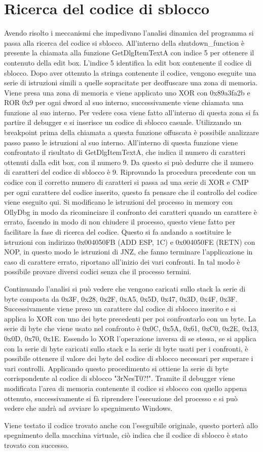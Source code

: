 \documentclass[a4paper,12pt]{article}
\begin{document}
\section{Ricerca del codice di sblocco}
Avendo risolto i meccanismi che impedivano l'analisi dinamica del programma si passa alla ricerca del codice si sblocco. All'interno della shutdown\_function è presente la chiamata alla funzione GetDlgItemTextA con indice 5 per ottenere il contenuto della edit box.  L'indice 5 identifica la edit box contenente il codice di sblocco. 
Dopo aver ottenuto la stringa contenente il codice, vengono eseguite una serie di istruzioni simili a quelle sopracitate per deoffuscare una zona di memoria. Viene presa una zona di memoria e viene applicato uno XOR con 0x89a3fa2b e ROR 0x9 per ogni dword al suo interno, successivamente viene chiamata una funzione al suo interno. Per vedere cosa viene fatto all'interno di questa zona si fa partire il debugger e si inserisce un codice di sblocco casuale. Utilizzando un breakpoint prima della chiamata a questa funzione offuscata è possibile analizzare passo passo le istruzioni al suo interno. All'interno di questa funzione viene confrontato il risultato di GetDlgItemTextA, che indica il numero di caratteri ottenuti dalla edit box, con il numero 9. Da questo si può dedurre che il numero di caratteri del codice di sblocco è 9.
Riprovando la procedura precedente con un codice con il corretto numero di caratteri si passa ad una serie di XOR e CMP per ogni carattere del codice inserito, questo fa pensare che il controllo del codice viene eseguito qui. Si modificano le istruzioni del processo in memory con OllyDbg in modo da ricominciare il confronto dei caratteri quando un carattere è errato, facendo in modo di non chiudere il processo, questo viene fatto per facilitare la fase di ricerca del codice.  Questo si fa andando a sostituire le istruzioni con indirizzo 0x004050FB (ADD ESP, 1C) e 0x004050FE (RETN) con NOP, in questo modo le istruzioni di JNZ, che fanno terminare l'applicazione in caso di carattere errato, riportano all'inizio dei vari confronti.
In tal modo è possibile provare diversi codici senza che il processo termini. 

Continuando l'analisi si può vedere che vengono caricati sullo stack la serie di byte composta da 0x3F, 0x28, 0x2F, 0xA5, 0x5D, 0x47, 0x3D, 0x4F, 0x3F. Successivamente viene preso un carattere dal codice di sblocco inserito e si applica lo XOR con uno dei byte precedenti per poi confrontarlo con un byte. La serie di byte che viene usato nel confronto è 0x0C, 0x5A, 0x61, 0xC0, 0x2E, 0x13, 0x0D, 0x70, 0x1E. Essendo lo XOR l'operazione inversa di se stessa, se si applica con la serie di byte caricati sullo stack e la serie di byte usati per i confronti, è possibile ottenere il valore dei byte del codice di sblocco necessari per superare i vari controlli. Applicando questo procedimento si ottiene la serie di byte corrispondente al codice di sblocco "3rNesT0?!". Tramite il debugger viene modificata l'area di memoria contenente il codice si sblocco con quello appena ottenuto, successivamente si fà riprendere l'esecuzione del processo e si può vedere che andrà ad avviare lo spegnimento Windows.

Viene testato il codice trovato anche con l'eseguibile originale, questo porterà allo spegnimento della macchina virtuale, ciò indica che il codice di sblocco è stato trovato con successo. 
\end{document}
